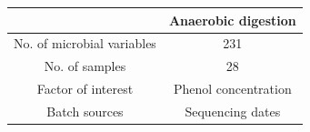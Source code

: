 \documentclass[a0paper,portrait]{baposter}
\begin{document}
\begin{poster}
{\begin{minipage}{\linewidth}
\centering
\small
\begin{tabular}{cc}
\hline
                   & \textbf{Anaerobic digestion} \\ \hline
No. of microbial variables       & 231                                        \\
No. of samples     & 28                                         \\
Factor of interest & {\color{cyan} Phenol concentration}               \\
Batch sources      & {\color{cyan} Sequencing dates}                     \\ \hline
\end{tabular}

\end{minipage} \\[0.07in]

}






\end{poster}
\end{document}

